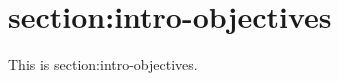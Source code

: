 \section{section:intro-objectives}
\label{section:intro-section:intro-objectives}

This is section:intro-objectives.